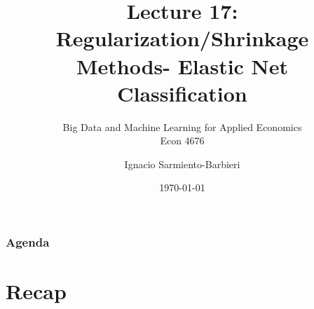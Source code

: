 \documentclass[
  shownotes,
  xcolor={svgnames},
  hyperref={colorlinks,citecolor=DarkBlue,linkcolor=DarkRed,urlcolor=DarkBlue}
  , aspectratio=169]{beamer}
\begin{document}
 
\title[Lecture 17]{Lecture 17: \\ Regularization/Shrinkage Methods- Elastic Net  \\ Classification}
\subtitle{Big Data and Machine Learning for Applied Economics \\ Econ 4676}
\date{\today}

\author[Sarmiento-Barbieri]{Ignacio Sarmiento-Barbieri}


\begin{frame}[noframenumbering]
\maketitle
\end{frame}





\begin{frame}
\frametitle{Agenda}

\tableofcontents

\end{frame}

\section{Recap }
\end{document}
